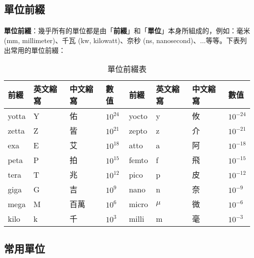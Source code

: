 \documentclass[12pt,a4paper,oneside]{book}
\begin{document}
\begin{CJK}{UTF8}{bkai}
\subsection{單位前綴}

\paragraph{}\textbf{單位前綴}：幾乎所有的單位都是由「\textbf{前綴}」和「\textbf{單位}」本身所組成的，例如：毫米 (mm, millimeter)、千瓦 (kw, kilowatt)、奈秒 (ns, nanosecond)、...等等。下表列出常用的單位前綴：

\begin{table}[h!]
\centering
\label{tbl:unit-prefix}
\begin{tabular}{|llll|llll|}
\hline
前綴    & 英文縮寫 & 中文縮寫 & 數值   & 前綴    & 英文縮寫 & 中文縮寫 & 數值    \\
\hline
yotta & Y    & 佑    & $10^{24}$ & yocto & y    & 攸    & $10^{-24}$\\
zetta & Z    & 皆    & $10^{21}$ & zepto & z    & 介    & $10^{-21}$\\
exa   & E    & 艾    & $10^{18}$ & atto  & a    & 阿    & $10^{-18}$\\
peta  & P    & 拍    & $10^{15}$ & femto & f    & 飛    & $10^{-15}$\\
tera  & T    & 兆    & $10^{12}$ & pico  & p    & 皮    & $10^{-12}$\\
giga  & G    & 吉    & $10^{9}$  & nano  & n    & 奈    & $10^{-9}$\\
mega  & M    & 百萬  & $10^{6}$  & micro & $\mu$& 微    & $10^{-6}$\\
kilo  & k    & 千    & $10^{3}$  & milli & m    & 毫    & $10^{-3}$\\
\hline
\end{tabular}
\caption{單位前綴表}
\end{table}

\subsection{常用單位}

\end{CJK}
\end{document}
